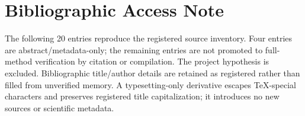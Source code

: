 \documentclass[10pt,twocolumn]{article}
\begin{document}
\clearpage
\section*{Bibliographic Access Note}
The following 20 entries reproduce the registered source inventory. Four entries are abstract/metadata-only; the remaining entries are not promoted to full-method verification by citation or compilation. The project hypothesis is excluded. Bibliographic title/author details are retained as registered rather than filled from unverified memory. A typesetting-only derivative escapes TeX-special characters and preserves registered title capitalization; it introduces no new sources or scientific metadata.
\nocite{*}


\end{document}
